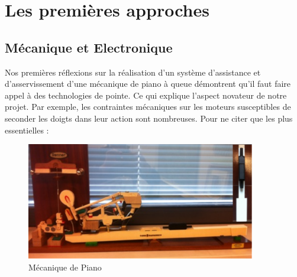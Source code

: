 \documentclass[french,a4paper,12pt]{report}
\begin{document}
\chapter{Les premières approches}

  \section{Mécanique et Electronique}
Nos premières réflexions sur la réalisation d’un système d’assistance et d’asservissement d’une mécanique de piano à queue démontrent qu’il faut faire appel à des technologies de pointe. Ce qui explique l’aspect novateur de notre projet. Par exemple, les contraintes mécaniques sur les moteurs susceptibles de seconder les doigts dans leur action sont nombreuses. Pour ne citer que les plus essentielles :\newline

	\begin{figure}[!ht]
    \center
    \includegraphics[width=10cm]{MECA_PIANO2.png}
    \caption{Mécanique de Piano}
		\end{figure} 

\end{document}
